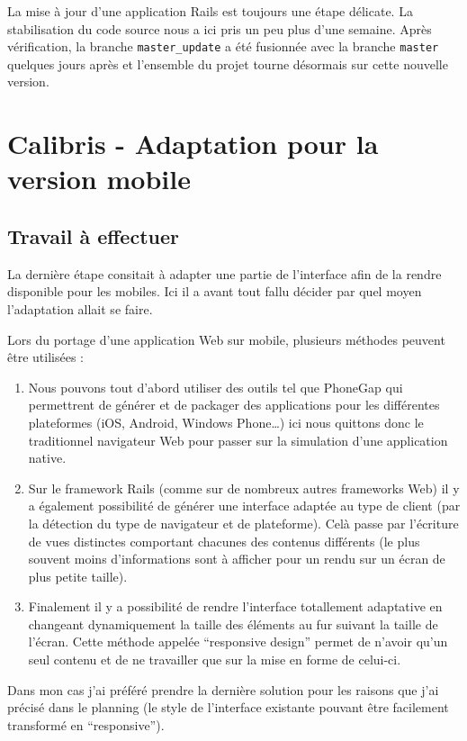 \documentclass[12pt,a4paper]{book}
\begin{document}
La mise à jour d'une application Rails est toujours une étape délicate. La stabilisation du code source nous a ici pris un peu plus d'une semaine. Après vérification, la branche \texttt{master\_update} a été fusionnée avec la branche \texttt{master} quelques jours après et l'ensemble du projet tourne désormais sur cette nouvelle version.

\section{Calibris - Adaptation pour la version mobile}

\subsection{Travail à effectuer}

La dernière étape consitait à adapter une partie de l'interface afin de la rendre disponible pour les mobiles. Ici il a avant tout fallu décider par quel moyen l'adaptation allait se faire.

Lors du portage d'une application Web sur mobile, plusieurs méthodes peuvent être utilisées :
\begin{enumerate}
  \item Nous pouvons tout d'abord utiliser des outils tel que PhoneGap qui permettrent de générer et de packager des applications pour les différentes plateformes (iOS, Android, Windows Phone…) ici nous quittons donc le traditionnel navigateur Web pour passer sur la simulation d'une application native.
  \item Sur le framework Rails (comme sur de nombreux autres frameworks Web) il y a également possibilité de générer une interface adaptée au type de client (par la détection du type de navigateur et de plateforme). Celà passe par l'écriture de vues distinctes comportant chacunes des contenus différents (le plus souvent moins d'informations sont à afficher pour un rendu sur un écran de plus petite taille).
  \item Finalement il y a possibilité de rendre l'interface totallement adaptative en changeant dynamiquement la taille des éléments au fur suivant la taille de l'écran. Cette méthode appelée ``responsive design'' permet de n'avoir qu'un seul contenu et de ne travailler que sur la mise en forme de celui-ci.
\end{enumerate}

Dans mon cas j'ai préféré prendre la dernière solution pour les raisons que j'ai précisé dans le planning (le style de l'interface existante pouvant être facilement transformé en ``responsive'').
\end{document}
